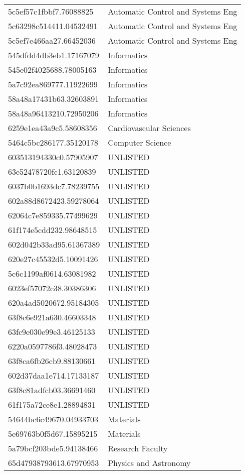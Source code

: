 \begin{tabular}{ll}
5c5ef57c1fbbf7.76088825 & Automatic Control and Systems Eng \\
5c63298c514411.04532491 & Automatic Control and Systems Eng \\
5c5ef7e466aa27.66452036 & Automatic Control and Systems Eng \\
545dfdd4db3eb1.17167079 & Informatics \\
545e02f4025688.78005163 & Informatics \\
5a7c92ea869777.11922699 & Informatics \\
58a48a17431b63.32603891 & Informatics \\
58a48a96413210.72950206 & Informatics \\
6259e1ea43a9c5.58608356 & Cardiovascular Sciences \\
5464c5bc286177.35120178 & Computer Science \\
603513194330c0.57905907 & UNLISTED \\
63e52478720fc1.63120839 & UNLISTED \\
6037b0b1693dc7.78239755 & UNLISTED \\
602a88d8672423.59278064 & UNLISTED \\
62064c7e859335.77499629 & UNLISTED \\
61f174e5cdd232.98648515 & UNLISTED \\
602d042b33ad95.61367389 & UNLISTED \\
620e27c45532d5.10091426 & UNLISTED \\
5c6c1199af0614.63081982 & UNLISTED \\
6023ef57072c38.30386306 & UNLISTED \\
620a4ad5020672.95184305 & UNLISTED \\
63f8c6e921a630.46603348 & UNLISTED \\
63fc9e030e99e3.46125133 & UNLISTED \\
6220a0597786f3.48028473 & UNLISTED \\
63f8ca6fb26cb9.88130661 & UNLISTED \\
602d37daa1e714.17133187 & UNLISTED \\
63f8c81adfcb03.36691460 & UNLISTED \\
61f175a72ce8e1.28894831 & UNLISTED \\
54644bc6c49670.04933703 & Materials \\
5e69763b0f5d67.15895215 & Materials \\
5a79bcf203bde5.94138466 & Research Faculty \\
65d47938793613.67970953 & Physics and Astronomy \\

\end{tabular}
